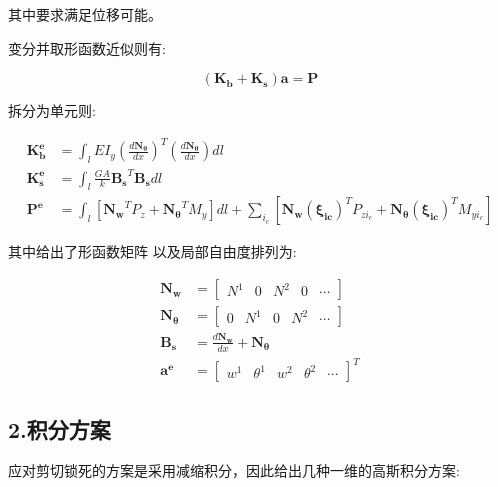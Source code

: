 \documentclass[UTF8,c5size]{ctexart}
\begin{document}
其中要求满足位移可能。

变分并取形函数近似则有:

\begin{equation}
    (\bm{K_b}+\bm{K_s})\bm{a}=\bm{P}    
\end{equation}

拆分为单元则:

\begin{equation}
    \begin{split}
        \bm{K_b^e}&=\int_{l}{EI_y\left(\frac{d\bm{N_\theta}}{dx}\right)^T\left(\frac{d\bm{N_\theta}}{dx}\right)dl}\\
        \bm{K_s^e}&=\int_{l}{\frac{GA}{k}\bm{B_s}^T\bm{B_s}dl}\\
        \bm{P^e}&=\int_{l}{\left[
            \bm{N_w}^TP_z+\bm{N_\theta}^TM_y
            \right]dl}+
            \sum_{i_c}{\left[
                \bm{N_w(\xi_{ic})}^TP_{zi_c}+\bm{N_\theta(\xi_{ic})}^TM_{yi_c}
            \right]}
    \end{split}
\end{equation}

其中给出了形函数矩阵
以及局部自由度排列为:

\begin{equation}
    \begin{split}
        \bm{N_w}&=
        \begin{bmatrix}
            N^1&0&N^2&0&\dotsb
        \end{bmatrix}\\
        \bm{N_\theta}&=
        \begin{bmatrix}
            0&N^1&0&N^2&\dotsb
        \end{bmatrix}\\
        \bm{B_s}&=\frac{d\bm{N_w}}{dx}+\bm{N_\theta}\\
        \bm{a^e}&=
        \begin{bmatrix}
            w^1&\theta^1&w^2&\theta^2&\dotsb
        \end{bmatrix}^T
    \end{split}
\end{equation}

\subsection*{2.积分方案}

应对剪切锁死的方案是采用减缩积分，因此给出几种一维的高斯积分方案:
\end{document}
